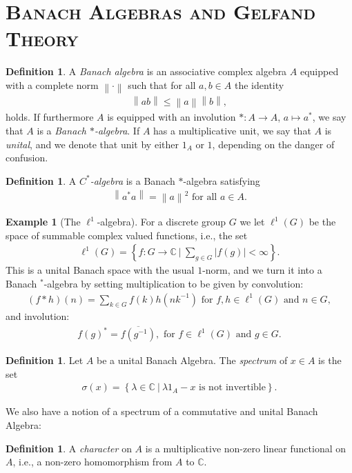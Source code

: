 \documentclass[10pt,twoside,openany,final]{memoir}
\newcommand{\sssection}[1]{%
\section[#1]{\centering\normalfont\scshape \textbf{#1}}}
\theoremstyle{definition}
\newtheorem{definition}[theorem]{Definition}
\theoremstyle{Break}
\newtheorem{example}[theorem]{Example}
\newcommand{\lv}{\left\lVert}
\newcommand{\rv}{\right\rVert}
\newcommand{\C}{\mathbb{C}}
\begin{document}
\sssection{Banach Algebras and Gelfand Theory}
\begin{definition}
	A \emph{Banach algebra} is an associative complex algebra $A$ equipped with a complete norm $\lv \cdot \rv$ such that for all $a,b \in A$ the identity
	\begin{align*}
		\lv ab \rv \leq \lv a \rv \lv b \rv,
	\end{align*}
	holds. If furthermore $A$ is equipped with an involution $* \colon A \to A$, $a \mapsto a^*$, we say that $A$ is a \emph{Banach $*$-algebra}. If $A$ has a multiplicative unit, we say that $A$ is \emph{unital}, and we denote that unit by either $1_A$ or $1$, depending on the danger of confusion.
\end{definition}
\begin{definition}
	A \emph{$C^*$-algebra} is a Banach $*$-algebra satisfying
	\begin{align*}
		\lv a^*a\rv = \lv a \rv^2 \text{ for all } a \in A.
	\end{align*}
\end{definition}
\begin{example}[The $\ell^1$-algebra]
For a discrete group $G$ we let $\ell^1(G)$ be the space of summable complex valued functions, i.e., the set
\begin{align*}
	\ell^1(G)=\left\{ f \colon G \to \C \ \Bigg| \ \sum_{g \in G}|f(g)| < \infty \right\}.
\end{align*}
This is a unital Banach space with the usual $1$-norm, and we turn it into a Banach $^*$-algebra by setting multiplication to be given by convolution:
\begin{align*}
	(f \ast h)(n)=\sum_{k \in G}f(k)h(nk^{-1}) \text{ for } f,h \in \ell^1(G) \text{ and } n \in G,
\end{align*}
and involution:
\begin{align*}
	f(g)^*=\overline{f(g^{-1})}, \text{ for } f \in \ell^1(G) \text{ and } g \in G.
\end{align*}
\end{example}
\begin{definition}
	Let $A$ be a unital Banach Algebra. The \emph{spectrum} of $x \in A$ is the set	
\begin{align*}
	\sigma(x)=\left\{ \lambda \in \C \ \big| \ \lambda 1_A - x \text{ is not invertible} \right\}.
\end{align*}
\end{definition}
We also have a notion of a spectrum of a commutative and unital Banach Algebra:
\begin{definition}
	A \emph{character} on $A$ is a multiplicative non-zero linear functional on $A$, i.e., a non-zero homomorphism from $A$ to $\C$.
\end{definition}
\end{document}
